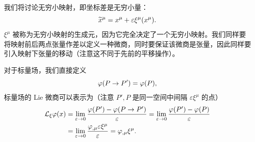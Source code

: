 \documentclass[UTF8, 12pt, a4paper, oneside, onecolumn, fontset=none]{ctexart}
\begin{document}
我们将讨论无穷小映射，即坐标差是无穷小量：
\begin{equation}
\widetilde{x}^{\mu}=x^{\mu}+\varepsilon\xi^{\mu}\mleft(x^{\mu}\mright).
\end{equation}
$\xi^{\mu}$ 被称为无穷小映射的生成元，因为它完全决定了一个无穷小映射。我们同样要将映射前后两点张量作差以定义一种微商，同时要保证该微商是张量，因此同样要引入映射下张量的移动（注意这不同于先前的平移操作）。

对于标量场，我们直接定义
\begin{equation}
\varphi\mleft(P\to P'\mright)=\varphi\mleft(P\mright),
\end{equation}
标量场的 Lie 微商可以表示为（注意 $P', P$ 是同一空间中间隔 $\varepsilon\xi^{\mu}$ 的点）
\begin{align}
\mathcal{L}_{\xi}\varphi\mleft(x\mright)&=\lim_{\varepsilon\to0}\frac{\varphi\mleft(P'\mright)-\varphi\mleft(P\to P'\mright)}{\varepsilon}=\lim_{\varepsilon\to0}\frac{\varphi\mleft(P'\mright)-\varphi\mleft(P\mright)}{\varepsilon}\notag\\
&=\lim_{\varepsilon\to0}\frac{\varphi_{,\mu}\varepsilon\xi^{\mu}}{\varepsilon}=\varphi_{,\mu}\xi^{\mu}.
\end{align}
\end{document}
